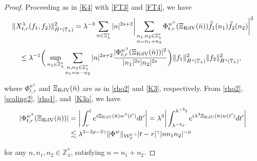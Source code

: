 \documentclass[letterpaper, 11pt,  reqno]{amsart}
\newcommand{\1}{\hspace{0.5mm}\text{I}\hspace{0.5mm}}
\newcommand{\noi}{\noindent}
\newcommand{\Z}{\mathbb{Z}}
\newcommand{\T}{\mathbb{T}}
\newcommand{\g}{\gamma}
\newcommand{\ld}{\lambda}
\newcommand{\ft}{\widehat}
\newcommand{\les}{\lesssim}
\newcommand{\W}{\mathcal{W}}
\newcommand{\KDV}{\text{\rm KdV} }
\numberwithin{equation}{section}
\numberwithin{theorem}{section}
\begin{document}
\begin{proof}

Proceeding as in 
\eqref{K4} with \eqref{FT3} and \eqref{FT4}, we have 
\begin{align}
\begin{aligned}
& \|X^{\ld}_{t,r}(f_1,f_2) \|^2_{\dot H^s(\T_\ld)}
=  \ld^{-3} 
\sum_{n\in\Z_\ld^*} |n|^{2s+ 2}
\bigg |  \sum_{ \substack{n_1, n_2 \in \Z_\ld^*\\n = n_1+n_2}}
\Phi^{w^\ld}_{t,r}(\Xi_\KDV(\bar n) ) 
\ft f_1(n_1)  \ft f_2 (n_2)  \bigg|^2 \\
&\quad \leq \ld^{-1}
\bigg(\sup_{n_1 \in \Z_\ld^*}
\sum_{\substack{n, n_2 \in \Z_\ld^*\\n_1 = n - n_2}} 
|n|^{2s+ 2}
\frac{|\Phi^{w^\ld}_{t,r} (\Xi_\KDV(\bar n)) |^2}{|n_1|^{2s}|n_2|^{2s}} \bigg)
\|f_1\|_{\dot H^s(\T_\ld)}^2
\|f_2\|_{\dot H^s(\T_\ld)}^2, 
\end{aligned}
\label{D2}
\end{align}


\noi
where $\Phi^{w^\ld}_{t,r}$ and
$\Xi_\KDV(\bar n)$ 
are 
 as in \eqref{rho2} and \eqref{K3}, 
 respectively.
From \eqref{rho2}, 
\eqref{scaling2}, 
\eqref{rho1}, and~\eqref{K3a}, 
we have
\begin{align}
\begin{aligned}
|\Phi^{w^\ld}_{t,r} (\Xi_\KDV(\bar n)) |
& = \bigg| 
\int_{r}^{t}  e^{i  \Xi_\KDV (\bar n) w^{\ld}(t') } d t'
\bigg|
= \ld^3   \bigg|  \int_{\ld^{-3}r}^{\ld^{-3}t} 
e^{i  \ld^3  \Xi_\KDV(\bar n)  w(t') } dt'  \bigg|  \\
& \les 
\ld^{3- 3\rho -3\g} 
 \|\Phi^{w}  \|_{\W_{T}^{\rho, \g}}
 |t-r|^{\g} 
 |n n_1 n_2|^{-\rho}
\end{aligned}
\label{D3}
\end{align} 




\noi
 for any $n, n_1, n_2\in \Z_\ld^*$,  satisfying $n = n_1+ n_2$.




\end{proof}
\end{document}
